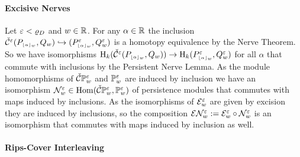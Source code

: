 
\paragraph{Excisive Nerves}

Let $\e < \varrho_D$ and $w\in\R$.
For any $\alpha\in\R$ the inclusion $\cech^\e(P\subi{w}{\alpha}, Q_w)\hookrightarrow (P\subi{w}{\alpha}^\e, Q_w^\e)$ is a homotopy equivalence by the Nerve Theorem.
So we have isomorphisms $\hom_k(\cech^\e(P\subi{w}{\alpha}, Q_w))\to \hom_k(P\subi{w}{\alpha}^\e, Q_w^\e)$ for all $\alpha$ that commute with inclusions by the Persistent Nerve Lemma.
As the module homomorphisms of $\CPP{w}{\e}$ and $\PP{w}{\e}$ are induced by inclusion we have an isomorphism $\N_w^\e\in\Hom(\CPP{w}{\e}, \PP{w}{\e})$ of persistence modules that commutes with maps induced by inclusions.
As the isomorphisms of $\E_w^\e$ are given by excision they are induced by inclusions, so the composition $\E\N_w^\e := \E_w^\e\circ \N_w^\e$ is an isomorphism that commutes with maps induced by inclusion as well.


\paragraph{Rips-Cover Interleaving}

